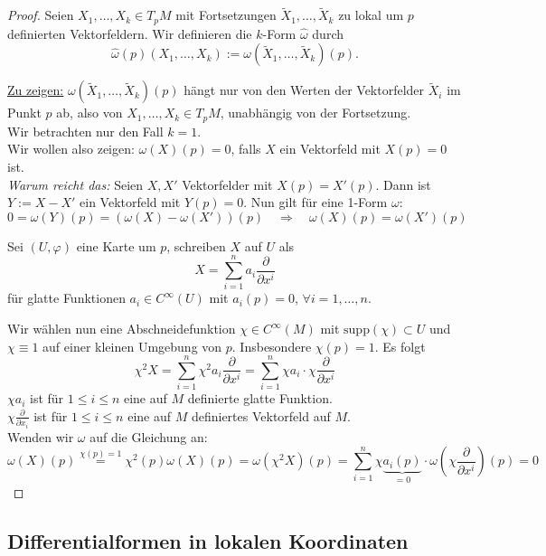 \documentclass[fleqn, 12pt, letterpaper]{article}
\newcommand{\deldel}[2]{\frac{\partial #1}{\partial #2}}
\newcommand{\txt}[1]{\text{#1}}
\begin{document}
\begin{proof}
    Seien \( X_1, \dots, X_k \in T_p M \) mit Fortsetzungen \( \tilde{X}_1, \dots, \tilde{X}_k \) zu lokal um \( p \) definierten Vektorfeldern. Wir definieren die \( k \)-Form \( \hat{\omega} \) durch
\[
\hat{\omega}(p)(X_1, \dots, X_k) := \omega(\tilde{X}_1, \dots, \tilde{X}_k)(p).
\]

\underline{Zu zeigen:} \( \omega(\tilde{X}_1, \dots, \tilde{X}_k)(p) \) hängt nur von den Werten der Vektorfelder \( \tilde{X}_i \) im Punkt \( p \) ab, also von \( X_1, \dots, X_k \in T_p M \), unabhängig von der Fortsetzung.\\

Wir betrachten nur den Fall \( k = 1 \).\\
Wir wollen also zeigen: \( \omega(X)(p) = 0 \), falls \( X \) ein Vektorfeld mit \( X(p) = 0 \) ist.\\

\textit{Warum reicht das:}  
Seien \( X, X' \) Vektorfelder mit \( X(p) = X'(p) \).  
Dann ist \( Y := X - X' \) ein Vektorfeld mit \( Y(p) = 0 \).  
Nun gilt für eine 1-Form \( \omega \):
\[
0 = \omega(Y)(p) = \left( \omega(X) - \omega(X') \right)(p)
\quad \Rightarrow \quad
\omega(X)(p) = \omega(X')(p)
\]

Sei \( (U, \varphi) \) eine Karte um \( p \), schreiben \( X \) auf \( U \) als
\[
X = \sum_{i=1}^n a_i \frac{\partial}{\partial x^i}
\]
für glatte Funktionen \( a_i \in C^\infty(U) \) mit \( a_i(p)=0 \), \( \forall i = 1, \dots, n \).

Wir wählen nun eine Abschneidefunktion \( \chi \in C^\infty(M) \) mit \(\txt{supp}(\chi)\subset U\) und \(\chi \equiv 1 \) auf einer kleinen Umgebung von \( p \). Insbesondere \( \chi(p) = 1 \). Es folgt
\[
\chi^2 X = \sum_{i=1}^n \chi^2 a_i \frac{\partial}{\partial x^i} = \sum_{i=1}^n \chi a_i \cdot\chi\frac{\partial}{\partial x^i}
\]
$\chi a_i$ ist für \( 1 \leq i \leq n \) eine auf \( M \) definierte glatte Funktion.\\
$\chi \deldel{}{x_i}$ ist für \( 1 \leq i \leq n \) eine auf \( M \) definiertes Vektorfeld auf $M$.\\

Wenden wir \( \omega \) auf die Gleichung an:
\[
\omega(X)(p) \overset{\chi(p)=1}{=} \chi^2(p) \omega(X)(p) = \omega(\chi^2 X)(p) = \sum_{i=1}^n \chi \underbrace{a_i(p)}_{=0} \cdot \omega(\chi\frac{\partial}{\partial x^i})(p) = 0
\]
\end{proof}
\subsection{Differentialformen in lokalen Koordinaten}
\end{document}
